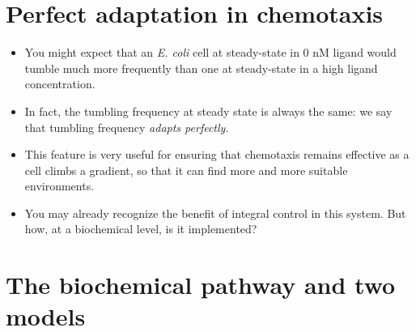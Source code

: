 \documentclass{article}
\begin{document}
\section*{Perfect adaptation in chemotaxis}

\begin{itemize}
\item You might expect that an \textit{E. coli} cell at steady-state in 0 nM ligand would tumble much more frequently than one at steady-state in a high ligand concentration.
\item In fact, the tumbling frequency at steady state is always the same: we say that tumbling frequency  \textit{adapts perfectly}.
\item This feature is very useful for ensuring that chemotaxis remains effective as a cell climbs a gradient, so that it can find more and more suitable environments.
\item You may already recognize the benefit of integral control in this system. But how, at a biochemical level, is it implemented?
\end{itemize}

\section*{The biochemical pathway and two models}
\end{document}
